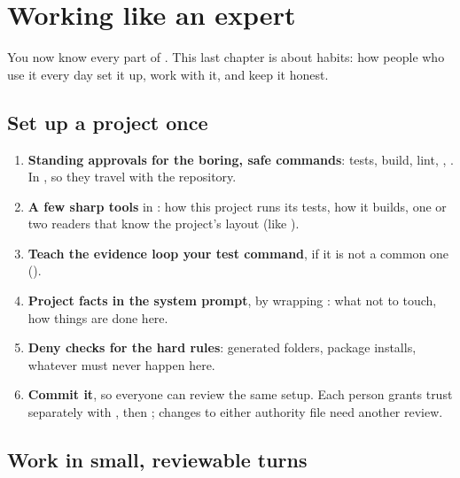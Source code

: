 \chapter{Working like an expert}
\label{ch:expert}

You now know every part of \nodwyn. This last chapter is about habits: how
people who use it every day set it up, work with it, and keep it honest.

\section{Set up a project once}

\begin{enumerate}
  \item \textbf{Standing approvals for the boring, safe commands}: tests,
    build, lint, , . In
    , so they travel with the repository.
  \item \textbf{A few sharp tools} in : how this
    project runs its tests, how it builds, one or two readers that know the
    project's layout (like ).
  \item \textbf{Teach the evidence loop your test command}, if it is not a
    common one ().
  \item \textbf{Project facts in the system prompt}, by wrapping
    : what not to touch, how things are done here.
  \item \textbf{Deny checks for the hard rules}: generated folders, package
    installs, whatever must never happen here.
  \item \textbf{Commit it}, so everyone can review the same setup. Each person
    grants trust separately with , then
    ; changes to either authority file need another review.
\end{enumerate}

\section{Work in small, reviewable turns}


